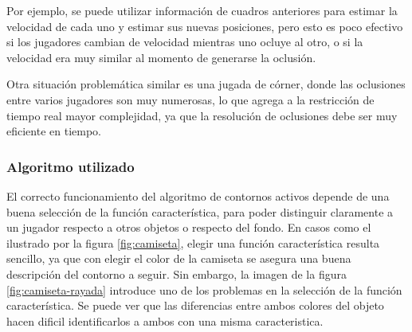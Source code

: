 Por ejemplo, se puede utilizar información de cuadros anteriores para
estimar la velocidad de cada uno y estimar sus nuevas posiciones, pero esto
es poco efectivo si los jugadores cambian de velocidad mientras uno ocluye
al otro, o si la velocidad era muy similar al momento de generarse la oclusión.

Otra situación problemática similar es una jugada de córner, donde las
oclusiones entre varios jugadores son muy numerosas, lo que agrega a la
restricción de tiempo real mayor complejidad, ya que la resolución de
oclusiones debe ser muy eficiente en tiempo.

\subsubsection{Algoritmo utilizado}

El correcto funcionamiento del algoritmo de contornos
activos\cite{fast-level-set} depende de una buena selección de la función
característica, para poder distinguir claramente a un jugador respecto a otros
objetos o respecto del fondo. En casos como el ilustrado por la figura
\ref{fig:camiseta}, elegir una función característica resulta sencillo, ya que
con elegir el color de la camiseta se asegura una buena descripción del contorno
a seguir. Sin embargo, la imagen de la figura \ref{fig:camiseta-rayada} introduce
uno de los problemas en la selección de la función característica. Se puede ver que
las diferencias entre ambos colores del objeto hacen dificil identificarlos a ambos
con una misma caracteristica.

